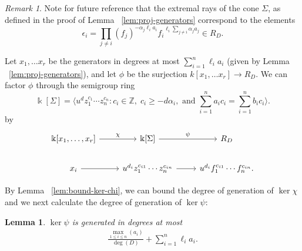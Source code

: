\documentclass{amsart}
\theoremstyle{plain}
\newtheorem{lem}[thm]{Lemma}
\theoremstyle{definition}
\theoremstyle{remark}
\newtheorem{rem}[thm]{Remark}
\numberwithin{equation}{section}
\newcommand\bk{{\Bbbk}}
\newcommand\bida{a}
\newcommand\bidb{b}
\begin{document}
\begin{rem}
\label{rem:pm-extremal-rays}
Note for future reference that the extremal rays of the cone $\Sigma$, as
defined in the proof of Lemma ~\ref{lem:proj-generators} correspond to the
elements
\begin{equation}
\label{eqn:epsilon-def-proj}
	\epsilon_i = \prod_{j\ne i} (f_j)^{-\alpha_j \ell_i a_i} {f_i}^{\ell_i \sum_{j\ne i} \alpha_j a_j}\in R_D.
\end{equation}
\end{rem}



Let $x_1, \ldots x_r$ be the generators in degrees at most $\sum_{i=1}^n \ell_i
\bida_i$ (given by Lemma ~\ref{lem:proj-generators}), and let $\phi$ be the
surjection $k[x_1, \ldots x_r] \to R_D$.  We can factor $\phi$ through the
semigroup ring 
\[
	\bk[\Sigma] =  \langle u^d z_1^{c_1} \cdots z_n^{c_n} : c_i \in
\mathbb{Z}, \; c_i \geq -d \alpha_i, \mbox{ and }\sum_{i=1}^{n} \bida_i c_i =
\sum_{i=1}^{n} \bidb_i c_i \rangle. 
\]
by
\[
\begin{tikzcd}
\bk[x_1,\ldots, x_r] \ar {r}{\chi} & \bk[\Sigma] \ar {r}{\psi} & R_D \\
x_i \ar r & u^{d_i}z_1^{c_{i1}} \cdots z_n^{c_{in}} \ar r & u^{d_i}f_1^{c_{i1}} \cdots f_n^{c_{in}}.
\end{tikzcd}
\]

By Lemma ~\ref{lem:bound-ker-chi}, we can bound the degree of generation of
$\ker \chi $ and we next calculate the degree of generation of $\ker \psi$:

\begin{lem}
\label{lem:proj-relations-psi}
$\ker \psi$ is generated in degrees at most
\begin{align}
\label{eqn:proj-relation-degree}
	\frac{\max_{1\le i \le n}(\bida_i)}{\deg(D)} +  \sum_{i=1}^n \ell_i a_i.
\end{align}

\end{lem}
\end{document}
